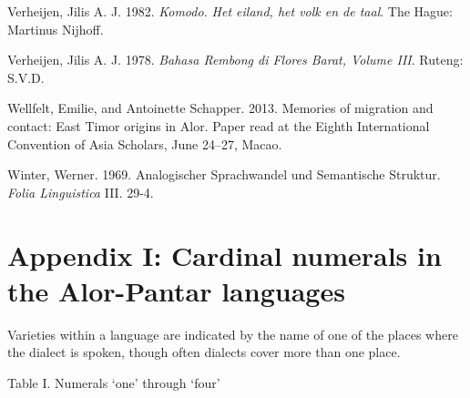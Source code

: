Verheijen, Jilis A. J. 1982. \textit{Komodo. }\textit{Het eiland, het volk en de taal}. The Hague: Martinus Nijhoff. 

Verheijen, Jilis A. J. 1978. \textit{Bahasa Rembong di Flores Barat, V}\textit{olume III}. Ruteng: S.V.D. 

Wellfelt, Emilie, and Antoinette Schapper. 2013. Memories of migration and contact: East Timor origins in Alor. Paper read at the Eighth International Convention of Asia Scholars, June 24--27, Macao. 

Winter, Werner. 1969. Analogischer Sprachwandel und Semantische Struktur. \textit{Folia Linguistica} III. 29-4.

\clearpage\setcounter{page}{1}\pagestyle{Convertedxxii}
\section[Appendix I: Cardinal numerals in the Alor{}-Pantar languages]{Appendix I: Cardinal numerals in the Alor-Pantar languages}
Varieties within a language are indicated by the name of one of the places where the dialect is spoken, though often dialects cover more than one place.

{\centering
Table I. Numerals {\textquoteleft}one{\textquoteright} through {\textquoteleft}four{\textquoteright} 
\par}


